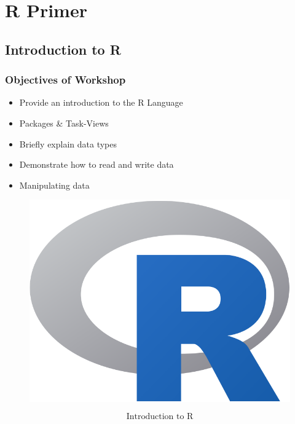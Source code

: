 \section{R Primer} 



\subsection{Introduction to R}

	\begin{frame}
	\frametitle{Objectives of Workshop}
	\begin{itemize}
		\item Provide an introduction to the R Language
		\item Packages \& Task-Views
		\item Briefly explain data types
		\item Demonstrate how to read and write data
		\item Manipulating data
	\end{itemize}
	\end{frame}

 	\begin{frame}[fragile]
 		\begin{figure}
 			\centering
 			\includegraphics[width=0.9\linewidth]{./figures/R_logo}
 		\end{figure}
 		\[ \mbox{Introduction to R} \]	
 	\end{frame}
 	

